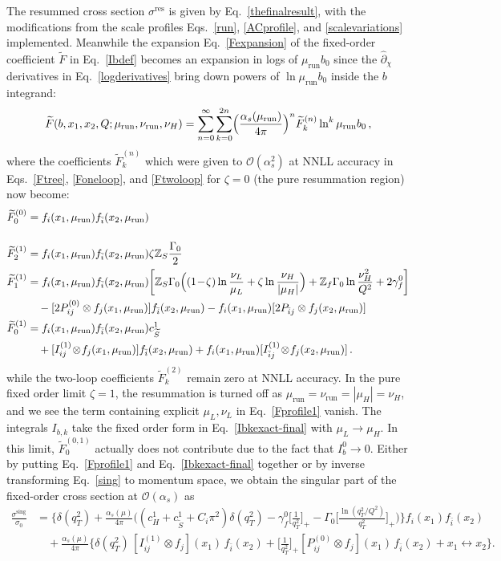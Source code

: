 \documentclass[a4,letterpaper,11pt]{article}
\newcommand{\nn}{\nonumber}
\newcommand{\be}{\begin{equation}}
\newcommand{\ee}{\end{equation}}
\newcommand{\abs}[1]{\left\lvert #1\right\rvert}
\newcommand{\minus}{\!-\!}
\newcommand{\plus}{\!+\!}
\newcommand{\run}{\text{run}}
\newcommand{\mur}{\mu_\run}
\newcommand{\nur}{\nu_\run}
\newcommand{\as}{\alpha_s}
\newcommand{\cO}{\mathcal{O}}
\newcommand{\zed}{\mathbb{Z}}
\newcommand{\wt}{\widetilde}
\newcommand{\eq}[1]{Eq.~\eqref{#1}}
\newcommand{\eqss}[3]{Eqs.~\eqref{#1}, \eqref{#2}, and \eqref{#3}}
\newcommand{\tS}{\widetilde{S}}
\begin{document}
The resummed cross section $\sigma^\text{res}$ is given by \eq{thefinalresult}, with the modifications from the scale profiles \eqss{run}{ACprofile}{scalevariations} implemented. Meanwhile the expansion \eq{Fexpansion} of the fixed-order coefficient $\wt F$ in \eq{Ibdef} becomes an expansion in logs of $\mur b_0$ since the $\hat\partial_\chi$ derivatives in \eq{logderivatives} bring down powers of $\ln \mur b_0$ inside the $b$ integrand:
\be
\label{Frunexpansion}
\wt F(b,x_1,x_2,Q;\mur,\nur,\nu_H) = \sum_{n=0}^\infty \sum_{k=0}^{2n} \Bigl(\frac{\as(\mur)}{4\pi}\Bigr)^n \wt F^{(n)}_k \ln^k\mur b_0\,,
\ee
where the coefficients $\wt F_k^{(n)}$ which were given to $\cO(\as^2)$ at NNLL accuracy in \eqss{Ftree}{Foneloop}{Ftwoloop} for $\zeta = 0$ (the pure resummation region) now become:
\begin{align}
\label{Fprofile0}
\wt F^{(0)}_0 &= f_i(x_1,\mur)f_{\bar i}(x_2,\mur) \\[12pt]
\label{Fprofile1}
\wt F^{(1)}_2 &= f_i(x_1,\mur)f_{\bar i}(x_2,\mur) \zeta\zed_S \frac{\Gamma_0}{2} \\
\wt F^{(1)}_1 &= f_i(x_1,\mur)f_{\bar i}(x_2,\mur) \biggl[ \zed_S \Gamma_0 \Bigl( (1\minus\zeta) \ln\frac{\nu_L}{\mu_L} + \zeta\ln \frac{\nu_H}{\abs{\mu_H}} \Bigr) + \zed_f \Gamma_0 \ln\frac{\nu_H^2}{Q^2}  + 2\gamma_f^0\biggr] \nn \\
&\quad  - [2P_{ij}^{(0)}\otimes f_j(x_1,\mur)] f_{\bar i}(x_2,\mur) -  f_i(x_1,\mur) [2P_{\bar i j} \otimes f_j(x_2,\mur)] \nn \\ 
\wt F^{(1)}_0 &= f_i(x_1,\mur) f_{\bar i}(x_2,\mur) c_{\wt S}^1 \nn \\
&\quad + [I_{ij}^{(1)}\!\otimes\! f_j(x_1,\mur)] f_{\bar i}(x_2,\mur) + f_i(x_1,\mur)[ I_{\bar i j}^{(1)}\!\otimes\! f_j(x_2,\mur)]\,.\, \nn
\end{align}
while the two-loop coefficients $\wt F_k^{(2)}$ remain zero at NNLL accuracy.
In the pure fixed order limit $\zeta=1$, the resummation is turned off as $\mur=\nur=|\mu_H|=\nu_H$, and we see the term containing explicit $\mu_L,\nu_L$ in \eq{Fprofile1} vanish.
The integrals $I_{b,k}$ take the fixed order form in \eq{Ibkexact-final} with $\mu_L\to \mu_H$.
In this limit, $\wt F_0^{(0,1)}$ actually does not contribute due to the fact that $I_b^0\to 0$.
Either by putting \eq{Fprofile1} and \eq{Ibkexact-final} together or by inverse transforming \eq{sing} to momentum space,
we obtain the singular part of the fixed-order cross section at $\cO(\as)$ as
\begin{align}\label{sigsing}
\frac{\sigma^\text{sing}}{\sigma_0}&=
 \biggl\{ \!  \delta(q_T^2)+\frac{\as(\mu)}{4\pi}\biggl(\! (c^1_H \plus c^1_{\tS} \plus C_i\pi^2) \delta(q_T^2)- \gamma_f^0 \biggl[\frac{1}{q_T^2}\biggr]_+ \! \! -\Gamma_0\biggl[\frac{\ln(q_T^2/Q^2)}{q_T^2}\biggr]_+ \biggr)\! \biggr\}f_i(x_1) f_{\bar i}(x_2)
\nn\\
& \quad +\frac{\as(\mu)}{4\pi}\biggl\{ \! \delta(q_T^2)\,[ I^{(1)}_{ij}\! \otimes \!  f_{j}](x_1)\, f_{\bar i}(x_2)+\biggl[\frac{1}{q_T^2}\biggr]_+ [P^{(0)}_{ij} \! \otimes\!  f_{j}](x_1)\, f_{\bar i}(x_2)+ x_1\! \leftrightarrow \! x_2 \! \biggr\} .
 \end{align}
\end{document}
